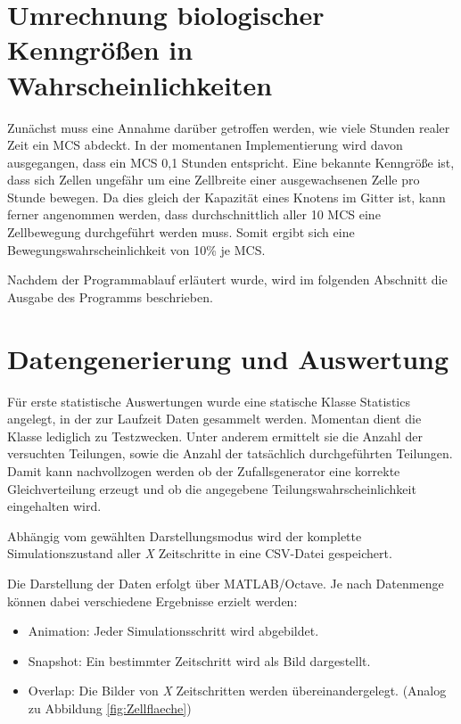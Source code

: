 \documentclass[11pt,a4paper,pointlessnumbers]{scrreprt}  %
\begin{document}
\section{Umrechnung biologischer Kenngrößen in Wahrscheinlichkeiten}
Zunächst muss eine Annahme darüber getroffen werden, wie viele Stunden realer Zeit ein MCS abdeckt. In der momentanen Implementierung wird davon ausgegangen, dass ein MCS 0,1 Stunden entspricht. Eine bekannte Kenngröße ist, dass sich Zellen ungefähr um eine Zellbreite einer ausgewachsenen Zelle pro Stunde bewegen. Da dies gleich der Kapazität eines Knotens im Gitter ist, kann ferner angenommen werden, dass durchschnittlich aller 10 MCS eine Zellbewegung durchgeführt werden muss. Somit ergibt sich eine Bewegungswahrscheinlichkeit von 10\% je MCS. \par 

Nachdem der Programmablauf erläutert wurde, wird im folgenden Abschnitt die Ausgabe des Programms beschrieben.


\section{Datengenerierung und Auswertung}
Für erste statistische Auswertungen wurde eine statische Klasse Statistics angelegt, in der zur Laufzeit Daten gesammelt werden. Momentan dient die Klasse lediglich zu Testzwecken. Unter anderem ermittelt sie die Anzahl der versuchten Teilungen, sowie die Anzahl der tatsächlich durchgeführten Teilungen. Damit kann nachvollzogen werden ob der Zufallsgenerator eine korrekte Gleichverteilung erzeugt und ob die angegebene Teilungswahrscheinlichkeit eingehalten wird. \par 

Abhängig vom gewählten Darstellungsmodus wird der komplette Simulationszustand aller \textit{X} Zeitschritte in eine CSV-Datei gespeichert. \par 

Die Darstellung der Daten erfolgt über MATLAB/Octave. Je nach Datenmenge können dabei verschiedene Ergebnisse erzielt werden:

\begin{itemize}
	\item Animation: Jeder Simulationsschritt wird abgebildet.
	\item Snapshot: Ein bestimmter Zeitschritt wird als Bild dargestellt.
	\item Overlap: Die Bilder von \textit{X} Zeitschritten werden übereinandergelegt. (Analog zu Abbildung \ref{fig:Zellflaeche})
\end{itemize}
\end{document}
